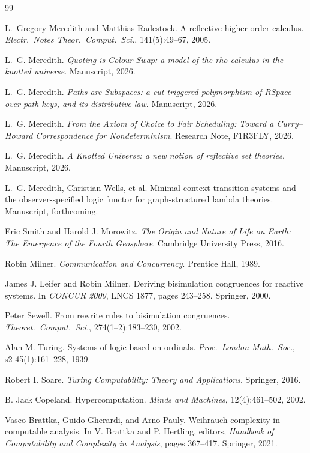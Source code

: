 \documentclass[11pt]{article}
\theoremstyle{definition}
\theoremstyle{plain}
\theoremstyle{remark}
\begin{document}
\begin{thebibliography}{99}

 L.~Gregory Meredith and Matthias Radestock. A reflective higher-order calculus.
\emph{Electr.\ Notes Theor.\ Comput.\ Sci.}, 141(5):49--67, 2005.

 L.~G. Meredith. \emph{Quoting is Colour-Swap: a model of the rho calculus in the
knotted universe}. Manuscript, 2026.

 L.~G. Meredith. \emph{Paths are Subspaces: a cut-triggered polymorphism of RSpace
over path-keys, and its distributive law}. Manuscript, 2026.

 L.~G. Meredith. \emph{From the Axiom of Choice to Fair Scheduling: Toward a
Curry--Howard Correspondence for Nondeterminism}. Research Note, F1R3FLY, 2026.

 L.~G. Meredith. \emph{A Knotted Universe: a new notion of reflective set theories}.
Manuscript, 2026.

 L.~G. Meredith, Christian Wells, et al. Minimal-context transition systems and the
observer-specified logic functor for graph-structured lambda theories. Manuscript, forthcoming.

 Eric Smith and Harold J. Morowitz. \emph{The Origin and Nature of Life on Earth:
The Emergence of the Fourth Geosphere}. Cambridge University Press, 2016.

 Robin Milner. \emph{Communication and Concurrency}. Prentice Hall, 1989.

 James J. Leifer and Robin Milner. Deriving bisimulation congruences for
reactive systems. In \emph{CONCUR 2000}, LNCS 1877, pages 243--258. Springer, 2000.

 Peter Sewell. From rewrite rules to bisimulation congruences. \emph{Theoret.\
Comput.\ Sci.}, 274(1--2):183--230, 2002.

 Alan M. Turing. Systems of logic based on ordinals. \emph{Proc.\ London Math.\
Soc.}, s2-45(1):161--228, 1939.

 Robert I. Soare. \emph{Turing Computability: Theory and Applications}. Springer,
2016.

 B. Jack Copeland. Hypercomputation. \emph{Minds and Machines}, 12(4):461--502, 2002.

\bibitem{weihrauch} Vasco Brattka, Guido Gherardi, and Arno Pauly. Weihrauch complexity in computable
analysis. In V. Brattka and P. Hertling, editors, \emph{Handbook of Computability and Complexity in
Analysis}, pages 367--417. Springer, 2021.


\end{thebibliography}
\end{document}
